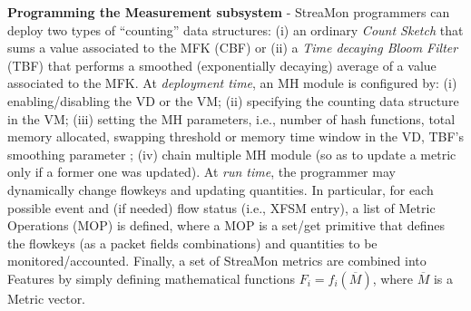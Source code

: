 \documentclass[conference,letterpaper]{sig-alternate-10pt}
\begin{document}
\textbf{Programming the Measurement subsystem} - StreaMon programmers can deploy two types of ``counting'' data structures: (i) an ordinary \emph{Count Sketch} that sums a value associated to the MFK (CBF) or (ii) a \emph{Time decaying Bloom Filter} (TBF) \cite{ccr11Bianchi} that performs a smoothed (exponentially decaying) average of a value associated to the MFK. At {\em deployment time}, an MH module is configured by: (i) enabling/disabling the VD or the VM; (ii) specifying the counting data structure in the VM; (iii) setting the MH parameters, i.e., number of hash functions, total memory allocated, swapping threshold \cite{info10Bianchi} or memory time window in the VD, TBF's smoothing parameter \cite{ccr11Bianchi}; (iv) chain multiple MH module (so as to update a metric only if a former one was updated). At {\em run time}, the programmer may dynamically change flowkeys and updating quantities.  In particular, for each possible event and (if needed) flow status (i.e., XFSM entry), a list of Metric Operations (MOP) is defined, where a MOP is a set/get primitive that defines the flowkeys (as a packet fields combinations) and quantities to be monitored/accounted. Finally, a set of StreaMon metrics are combined into Features by simply defining mathematical functions $F_i=f_i(\overline{M})$, where $\overline{M}$ is a Metric vector.
\end{document}
